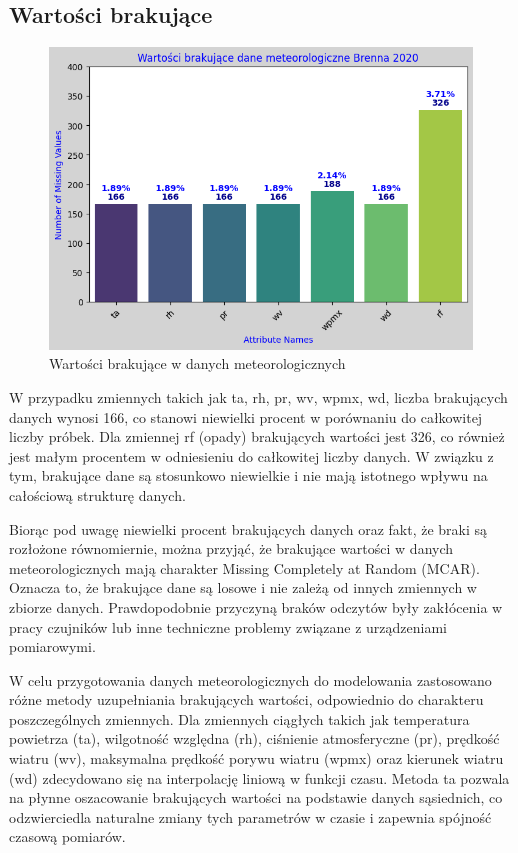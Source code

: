 \documentclass[10pt,a4paper]{article}
\begin{document}
\subsection*{Wartości brakujące}
\begin{figure}[h]
	\centering
	\includegraphics[scale=0.7]{ms_val.png}
	\caption{Wartości brakujące w danych meteorologicznych}
	\label{fig:my_label}
\end{figure}
\noindent W przypadku zmiennych takich jak ta, rh, pr, wv, wpmx, wd, liczba brakujących danych wynosi 166, co stanowi niewielki procent w porównaniu do całkowitej liczby próbek. Dla zmiennej rf (opady) brakujących wartości jest 326, co również jest małym procentem w odniesieniu do całkowitej liczby danych. W związku z tym, brakujące dane są stosunkowo niewielkie i nie mają istotnego wpływu na całościową strukturę danych.
\par
\hspace{0.75cm}
Biorąc pod uwagę niewielki procent brakujących danych oraz fakt, że braki są rozłożone równomiernie, można przyjąć, że brakujące wartości w danych meteorologicznych mają charakter Missing Completely at Random (MCAR). Oznacza to, że brakujące dane są losowe i nie zależą od innych zmiennych w zbiorze danych. Prawdopodobnie przyczyną braków odczytów były zakłócenia w pracy czujników lub inne techniczne problemy związane z urządzeniami pomiarowymi.
\par
\hspace{0.75cm}
W celu przygotowania danych meteorologicznych do modelowania zastosowano różne metody uzupełniania brakujących wartości, odpowiednio do charakteru poszczególnych zmiennych. Dla zmiennych ciągłych takich jak temperatura powietrza (ta), wilgotność względna (rh), ciśnienie atmosferyczne (pr), prędkość wiatru (wv), maksymalna prędkość porywu wiatru (wpmx) oraz kierunek wiatru (wd) zdecydowano się na interpolację liniową w funkcji czasu. Metoda ta pozwala na płynne oszacowanie brakujących wartości na podstawie danych sąsiednich, co odzwierciedla naturalne zmiany tych parametrów w czasie i zapewnia spójność czasową pomiarów.
\end{document}

